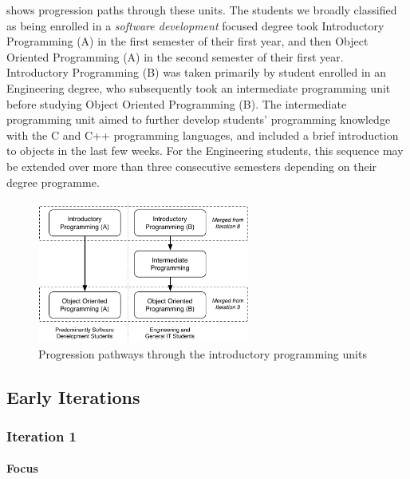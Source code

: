  shows progression paths through these units. The students we broadly classified as being enrolled in a \emph{software development} focused degree took Introductory Programming (A) in the first semester of their first year, and then Object Oriented Programming (A) in the second semester of their first year. Introductory Programming (B) was taken primarily by student enrolled in an Engineering degree, who subsequently took an intermediate programming unit before studying Object Oriented Programming (B). The intermediate programming unit aimed to further develop students' programming knowledge with the C and C++ programming languages, and included a brief introduction to objects in the last few weeks. For the Engineering students, this sequence may be extended over more than three consecutive semesters depending on their degree programme.

\begin{figure}[htbp]
  \centering
  \includegraphics[width=0.62\textwidth]{UnitPaths}
  \caption{Progression pathways through the introductory programming units}
  \label{fig:unit_paths}
\end{figure}


\subsection{Early Iterations} %
\label{sub:early_iterations}

\subsubsection{Iteration 1} %
\label{sub:iteration_1}

\paragraph{Focus} %

